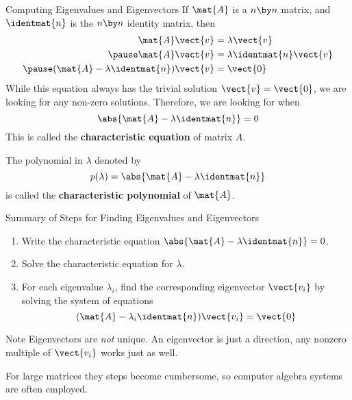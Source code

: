 \documentclass{beamer}
\begin{document}
\begin{frame}
\begin{block}{Computing Eigenvalues and Eigenvectors}
If $\mat{A}$ is a $n\by n$ matrix, and $\identmat{n}$ is the $n\by n$ identity matrix, then 
\begin{equation*}
\begin{aligned}
\mat{A}\vect{v}&=\lambda\vect{v}\\\pause
\mat{A}\vect{v}&=\lambda\identmat{n}\vect{v}\\\pause
(\mat{A}-\lambda\identmat{n})\vect{v}&=\vect{0}
\end{aligned}
\end{equation*}\pause
While this equation always has the trivial solution $\vect{v}=\vect{0}$, we are looking for any non-zero solutions. Therefore, we are looking for when
\begin{equation*}
\abs{\mat{A}-\lambda\identmat{n}}=0
\end{equation*}\pause
This is called the \textbf{characteristic equation} of matrix $A$.\pause

\vspace{2mm} The polynomial in $\lambda$ denoted by 
\begin{equation*}
p(\lambda)=\abs{\mat{A}-\lambda\identmat{n}}
\end{equation*}
is called the \textbf{characteristic polynomial} of $\mat{A}$.
\end{block}
\end{frame}

\begin{frame}
\begin{block}{Summary of Steps for Finding Eigenvalues and Eigenvectors}
\begin{enumerate}
\item Write the characteristic equation $\abs{\mat{A}-\lambda\identmat{n}}=0$.
\item Solve the characteristic equation for $\lambda$.
\item For each eigenvalue $\lambda_i$, find the corresponding eigenvector $\vect{v_i}$ by solving the system of equations 
\begin{equation*}
(\mat{A}-\lambda_i\identmat{n})\vect{v_i}=\vect{0}
\end{equation*}
\end{enumerate}
\end{block}\pause
\begin{block}{Note}
Eigenvectors are \emph{not} unique. An eigenvector is just a direction, any nonzero multiple of $\vect{v_i}$ works just as well.
\end{block}\pause
\begin{block}{}
For large matrices they steps become cumbersome, so computer algebra systems are often employed.
\end{block}
\end{frame}
\end{document}
